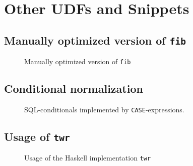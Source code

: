 \newpage
{}
\restoregeometry

\section{Other UDFs and Snippets}

\subsection{Manually optimized version of \texttt{fib}}

\begin{figure}[h!]
    \centering
    
    \caption{Manually optimized version of \texttt{fib}}
    \label{udf:fib_man}
\end{figure}

\subsection{Conditional normalization}

\begin{figure}[h!]
    \centering
{}\label{sql:conditionals}
    \caption{SQL-conditionals implemented by \texttt{CASE}-expressions.}
    \label{conditional_normalization}
\end{figure}

\subsection{Usage of \texttt{twr}}
\begin{figure}[h!]
    \centering
    
    \caption{Usage of the Haskell implementation \texttt{twr}}
\end{figure}